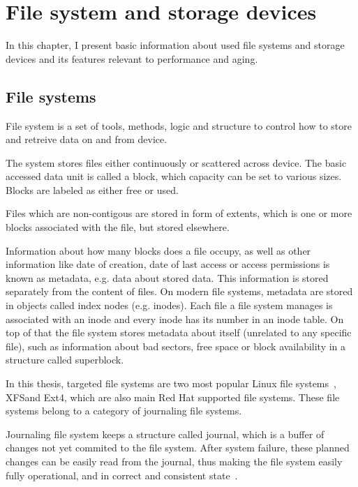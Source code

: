 \documentclass[
  color, %
  table, %
  lof,   %
  lot,   %
]{fithesis3}
\begin{document}

\chapter{File system and storage devices}
\label{fs}
In this chapter, I present basic information about used file systems and storage devices and its features relevant to performance and aging.

\section{File systems}
File system is a set of tools, methods, logic and structure to control how to store and retreive data on and from device.

The system stores files either continuously or scattered across device. The basic accessed data unit is called a block, which capacity can be set to various sizes. Blocks are labeled as either free or used.

Files which are non-contigous are stored in form of extents, which is one or more blocks associated with the file, but stored elsewhere.  

Information about how many blocks does a file occupy, as well as other information like date of creation, date of last access or access permissions is known as metadata, e.g. data about stored data. This information is stored separately from the content of files. On modern file systems, metadata are stored in objects called index nodes (e.g. inodes). Each file a file system manages is associated with an inode and every inode has its number in an inode table. On top of that the file system stores metadata about itself (unrelated to any specific file), such as information about bad sectors, free space or block availability in a structure called superblock.

In this thesis, targeted file systems are two most popular Linux file systems~\cite{Lu:2013:SLF:2591272.2591276}, XFS\footnotemark[1] and Ext4\footnotemark[2], which are also main Red Hat supported file systems. These file systems belong to a category of journaling file systems.

Journaling file system keeps a structure called journal, which is a buffer of changes not yet commited to the file system. After system failure, these planned changes can be easily read from the journal, thus making the file system easily fully operational, and in correct and consistent state~\cite{prabhakaran2005analysis}.
\end{document}
